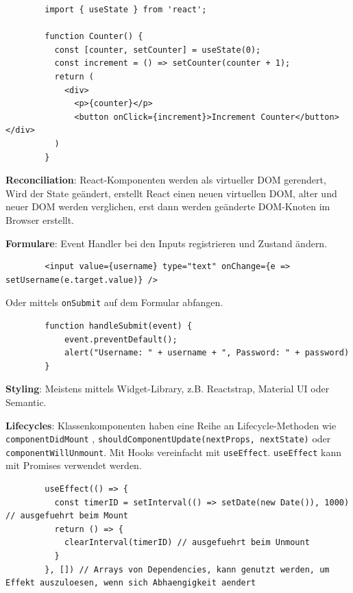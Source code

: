 \documentclass[10pt,landscape]{article}
\begin{document}
\begin{multicols}{3}
        \begin{lstlisting}
        import { useState } from 'react';

        function Counter() {
          const [counter, setCounter] = useState(0);
          const increment = () => setCounter(counter + 1);
          return (
            <div>
              <p>{counter}</p>
              <button onClick={increment}>Increment Counter</button> </div>
          )
        }
        \end{lstlisting}

        \textbf{Reconciliation}: React-Komponenten werden als virtueller DOM gerendert, Wird der State geändert, erstellt React einen neuen virtuellen DOM, alter und neuer DOM werden verglichen, erst dann werden geänderte DOM-Knoten im Browser erstellt.

        \textbf{Formulare}: Event Handler bei den Inputs registrieren und Zustand ändern.

        \begin{lstlisting}
        <input value={username} type="text" onChange={e => setUsername(e.target.value)} />
        \end{lstlisting}

        Oder mittels \lstinline{onSubmit} auf dem Formular abfangen.

        \begin{lstlisting}
        function handleSubmit(event) {
            event.preventDefault();
            alert("Username: " + username + ", Password: " + password)
        }
        \end{lstlisting}

        \textbf{Styling}: Meistens mittels Widget-Library, z.B. Reactstrap, Material UI oder Semantic.

        \textbf{Lifecycles}: Klassenkomponenten haben eine Reihe an Lifecycle-Methoden wie \lstinline{componentDidMount} , \lstinline{shouldComponentUpdate(nextProps, nextState)} oder \lstinline{componentWillUnmount}.
        Mit Hooks vereinfacht mit \lstinline{useEffect}.
        \lstinline{useEffect} kann mit Promises verwendet werden.

        \begin{lstlisting}
        useEffect(() => {
          const timerID = setInterval(() => setDate(new Date()), 1000) // ausgefuehrt beim Mount
          return () => {
            clearInterval(timerID) // ausgefuehrt beim Unmount
          }
        }, []) // Arrays von Dependencies, kann genutzt werden, um Effekt auszuloesen, wenn sich Abhaengigkeit aendert
        \end{lstlisting}


\end{multicols}
\end{document}
